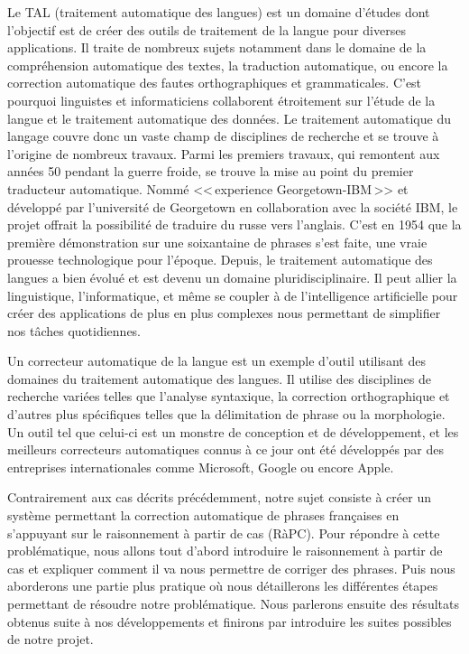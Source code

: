 \documentclass[11pt]{article}
\begin{document}
Le TAL (traitement automatique des langues) est un domaine d'\'{e}tudes dont l'objectif est de cr\'{e}er des outils de traitement de la langue pour diverses applications. Il traite de nombreux sujets notamment dans le domaine de la compr\'{e}hension automatique des textes, la traduction automatique, ou encore la correction automatique des fautes orthographiques et grammaticales. C'est pourquoi linguistes et informaticiens collaborent \'{e}troitement sur l'\'{e}tude de la langue et le traitement automatique des donn\'{e}es. Le traitement automatique du langage couvre donc un vaste champ de disciplines de recherche et se trouve \`{a} l'origine de nombreux travaux. 
\newline
\newline
Parmi les premiers travaux, qui remontent aux ann\'{e}es 50 pendant la guerre froide, se trouve la mise au point du premier traducteur automatique. Nomm\'{e} <<\,experience Georgetown-IBM\,>> et d\'{e}velopp\'{e} par l'universit\'{e} de Georgetown en collaboration avec la soci\'{e}t\'{e} IBM, le projet offrait la possibilit\'{e} de traduire du russe vers l'anglais. C'est en 1954 que la premi\`{e}re d\'{e}monstration sur une soixantaine de phrases s'est faite, une vraie prouesse technologique pour l'\'{e}poque. Depuis, le traitement automatique des langues a bien \'{e}volu\'{e} et est devenu un domaine pluridisciplinaire. Il peut allier la linguistique, l'informatique, et m\^{e}me se coupler \`{a} de l'intelligence artificielle pour cr\'{e}er des applications de plus en plus complexes nous permettant de simplifier nos t\^{a}ches quotidiennes. 
\newline

Un correcteur automatique de la langue est un exemple d'outil utilisant des domaines du traitement automatique des langues. Il utilise des disciplines de recherche vari\'{e}es telles que l'analyse syntaxique, la correction orthographique et d'autres plus sp\'{e}cifiques telles que la d\'{e}limitation de phrase ou la morphologie. Un outil tel que celui-ci est un monstre de conception et de d\'{e}veloppement, et les meilleurs correcteurs automatiques connus \`{a} ce jour ont \'{e}t\'{e} d\'{e}velopp\'{e}s par des entreprises internationales comme Microsoft, Google ou encore Apple. 
\newline

Contrairement aux cas d\'{e}crits pr\'{e}c\'{e}demment, notre sujet consiste \`{a} cr\'{e}er un syst\`{e}me permettant la correction automatique de phrases fran\c{c}aises en s'appuyant sur le raisonnement \`{a} partir de cas (R\`{a}PC). Pour r\'{e}pondre \`{a} cette probl\'{e}matique, nous allons tout d'abord introduire le raisonnement \`{a} partir de cas et expliquer comment il va nous permettre de corriger des phrases. Puis nous aborderons une partie plus pratique o\`{u} nous d\'{e}taillerons les diff\'{e}rentes \'{e}tapes permettant de r\'{e}soudre notre probl\'{e}matique. Nous parlerons ensuite des r\'{e}sultats obtenus suite \`{a} nos d\'{e}veloppements et finirons par introduire les suites possibles de notre projet.
\newline
\end{document}
